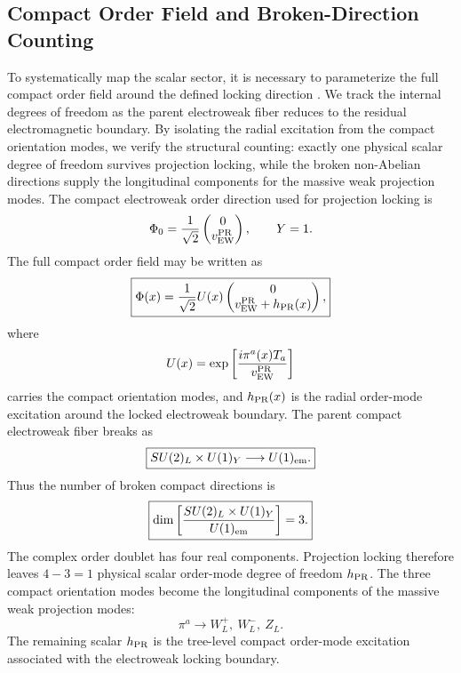\documentclass[11pt]{article}
\begin{document}
\subsection{Compact Order Field and Broken-Direction Counting}
\label{sec:pr2_compact_order_field_counting}
To systematically map the scalar sector, it is necessary to parameterize the full compact order field around the defined locking direction \cite{Higgs1964PRL, EnglertBrout1964}. We track the internal degrees of freedom as the parent electroweak fiber reduces to the residual electromagnetic boundary. By isolating the radial excitation from the compact orientation modes, we verify the structural counting: exactly one physical scalar degree of freedom survives projection locking, while the broken non-Abelian directions supply the longitudinal components for the massive weak projection modes. The compact electroweak order direction used for projection locking is
\begin{equation}
\Phi_0
=
\frac{1}{\sqrt2}
\begin{pmatrix}
0\\
v_{\rm EW}^{\rm PR}
\end{pmatrix},
\qquad
Y=1.
\end{equation}
The full compact order field may be written as
\begin{equation}
\boxed{
\Phi(x)
=
\frac{1}{\sqrt2}
U(x)
\begin{pmatrix}
0\\
v_{\rm EW}^{\rm PR}+h_{\rm PR}(x)
\end{pmatrix},
}
\end{equation}
where
\begin{equation}
U(x)
=
\exp
\left[
\frac{i\pi^a(x)T_a}{v_{\rm EW}^{\rm PR}}
\right]
\end{equation}
carries the compact orientation modes, and \(h_{\rm PR}(x)\) is the radial order-mode excitation around the locked electroweak boundary. The parent compact electroweak fiber breaks as
\begin{equation}
\boxed{
SU(2)_L\times U(1)_Y
\longrightarrow
U(1)_{\rm em}.
}
\end{equation}
Thus the number of broken compact directions is
\begin{equation}
\boxed{
\dim
\left[
\frac{
SU(2)_L\times U(1)_Y
}{
U(1)_{\rm em}
}
\right]
=
3.
}
\end{equation}
The complex order doublet has four real components. 
Projection locking therefore leaves $4-3=1$ physical scalar order-mode degree of freedom $h_{\rm PR}$.
The three compact orientation modes become the longitudinal components of the massive weak projection modes:
\begin{equation}
\pi^a
\longrightarrow
W_L^+,\ W_L^-,\ Z_L.
\end{equation}
The remaining scalar \(h_{\rm PR}\) is the tree-level compact order-mode excitation associated with the electroweak locking boundary.
\end{document}
